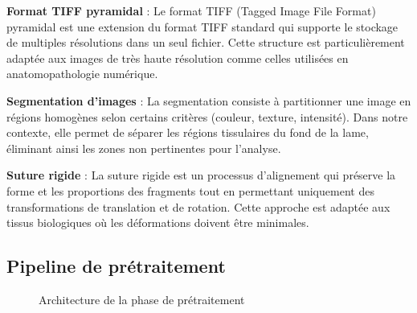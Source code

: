 \documentclass[12pt,a4paper]{report}
\begin{document}
\textbf{Format TIFF pyramidal} : Le format TIFF (Tagged Image File Format) pyramidal est une extension du format TIFF standard qui supporte le stockage de multiples résolutions dans un seul fichier. Cette structure est particulièrement adaptée aux images de très haute résolution comme celles utilisées en anatomopathologie numérique.

\textbf{Segmentation d'images} : La segmentation consiste à partitionner une image en régions homogènes selon certains critères (couleur, texture, intensité). Dans notre contexte, elle permet de séparer les régions tissulaires du fond de la lame, éliminant ainsi les zones non pertinentes pour l'analyse.

\textbf{Suture rigide} : La suture rigide est un processus d'alignement qui préserve la forme et les proportions des fragments tout en permettant uniquement des transformations de translation et de rotation. Cette approche est adaptée aux tissus biologiques où les déformations doivent être minimales.

\subsection{Pipeline de prétraitement}

\begin{figure}[H]
\centering
{}
\caption{Architecture de la phase de prétraitement}
\end{figure}
\end{document}
